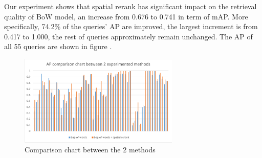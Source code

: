 Our experiment shows that spatial rerank has significant impact on the retrieval quality of BoW model, an increase from 0.676 to 0.741 in term of mAP. More specifically, 74.2\% of the queries' AP are improved, the largest increment is from 0.417 to 1.000, the rest of queries approximately remain unchanged. The AP of all 55 queries are shown in figure \cite{fig:ap_chart}.

\begin{figure}
    \centering
    \includegraphics[width=3.0in]{mAP.pdf}
    \caption{Comparison chart between the 2 methods}
    \label{fig:ap_chart}
\end{figure}
